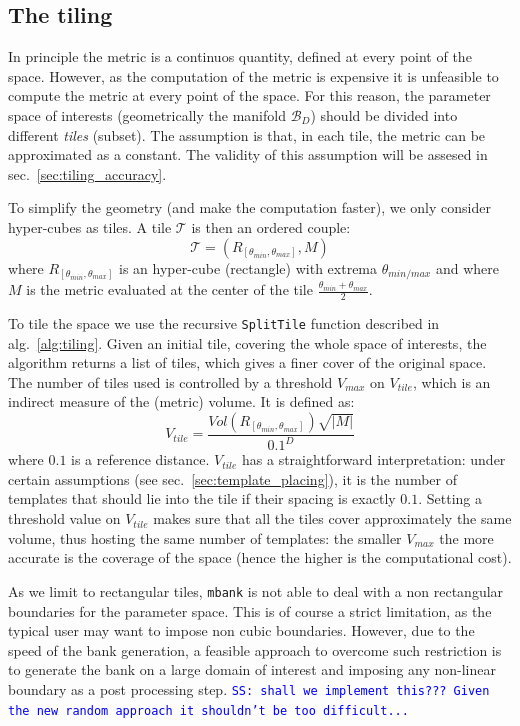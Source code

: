\documentclass[twocolumn,showpacs,preprintnumbers,nofootinbib,prd,
superscriptaddress,10pt]{revtex4-1}
\newcommand{\stefano}[1]{{\textcolor{blue}{\texttt{SS: #1}} }}
\begin{document}
\subsection{The tiling} \label{sec:tiling}

In principle the metric is a continuos quantity, defined at every point of the space. However, as the computation of the metric is expensive it is unfeasible to compute the metric at every point of the space.
For this reason, the parameter space of interests (geometrically the manifold $\mathcal{B}_D$) should be divided into different {\it tiles} (subset). The assumption is that, in each tile, the metric can be approximated as a constant.
The validity of this assumption will be assesed in sec.~\ref{sec:tiling_accuracy}.

To simplify the geometry (and make the computation faster), we only consider hyper-cubes as tiles. A tile $\mathcal{T}$ is then an ordered couple:
\begin{equation} \label{eq:tile}
	\mathcal{T} = \left(R_{[\theta_{min}, \theta_{max}]}, M \right)
\end{equation}
where $R_{[\theta_{min}, \theta_{max}]}$ is an hyper-cube (rectangle) with extrema $\theta_{min/max}$ and where $M$ is the metric evaluated at the center of the tile $\frac{\theta_{min}+\theta_{max}}{2}$.

To tile the space we use the recursive \texttt{SplitTile} function described in alg.~\ref{alg:tiling}.
Given an initial tile, covering the whole space of interests, the algorithm returns a list of tiles, which gives a finer cover of the original space.
The number of tiles used is controlled by a threshold $V_{max}$ on $V_{tile}$, which is an indirect measure of the (metric) volume. It is defined as:
\begin{equation} \label{eq:templates}
	V_{tile} = \frac{Vol(R_{[\theta_{min}, \theta_{max}]}) \sqrt{|M|}}{0.1^D}
\end{equation}
where $0.1$ is a reference distance.
$V_{tile}$ has a straightforward interpretation: under certain assumptions (see sec.~\ref{sec:template_placing}), it is the number of templates that should lie into the tile if their spacing is exactly $0.1$.
Setting a threshold value on $V_{tile}$ makes sure that all the tiles cover approximately the same volume, thus hosting the same number of templates: the smaller $V_{max}$ the more accurate is the coverage of the space (hence the higher is the computational cost).

As we limit to rectangular tiles, \texttt{mbank} is not able to deal with a non rectangular boundaries for the parameter space. This is of course a strict limitation, as the typical user may want to impose non cubic boundaries. However, due to the speed of the bank generation, a feasible approach to overcome such restriction is to generate the bank on a large domain of interest and imposing any non-linear boundary as a post processing step. \stefano{shall we implement this??? Given the new random approach it shouldn't be too difficult...}
\end{document}
